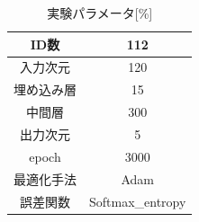\begin{table}[t]
	\caption{実験パラメータ[\%]}
	\label{tb:04_param1}
	\vspace{3mm}
	\centering
	\begin{tabular}{|c|c|}
		\hline
		ID数&112\\
		\hline
		入力次元&120\\
		\hline
		埋め込み層&15\\
		\hline
		中間層&300\\
		\hline
		出力次元&5\\
		\hline
		epoch&3000\\
		\hline
		最適化手法&Adam\\
		\hline
		誤差関数&Softmax\_entropy\\
		\hline
	\end{tabular} 
\end{table}







